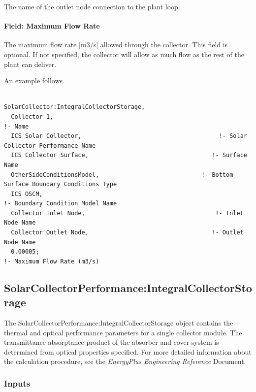 The name of the outlet node connection to the plant loop.

\paragraph{Field: Maximum Flow Rate}\label{field-maximum-flow-rate-1-000}

The maximum flow rate {[}m3/s{]} allowed through the collector. This field is optional. If not specified, the collector will allow as much flow as the rest of the plant can deliver.

An example follows.

\begin{lstlisting}

SolarCollector:IntegralCollectorStorage,
  Collector 1,                                                       !- Name
  ICS Solar Collector,                                       !- Solar Collector Performance Name
  ICS Collector Surface,                                   !- Surface Name
  OtherSideConditionsModel,                             !- Bottom Surface Boundary Conditions Type
  ICS OSCM,                                                             !- Boundary Condition Model Name
  Collector Inlet Node,                                     !- Inlet Node Name
  Collector Outlet Node,                                   !- Outlet Node Name
  0.00005;                                                               !- Maximum Flow Rate (m3/s)
\end{lstlisting}

\subsection{SolarCollectorPerformance:IntegralCollectorStorage}\label{solarcollectorperformanceintegralcollectorstorage}

The SolarCollectorPerformance:IntegralCollectorStorage object contains the thermal and optical performance parameters for a single collector module. The transmittance-absorptance product of the absorber and cover system is determined from optical properties specified. For more detailed information about the calculation procedure, see the \emph{EnergyPlus Engineering Reference} Document.

\subsubsection{Inputs}\label{inputs-3-035}

